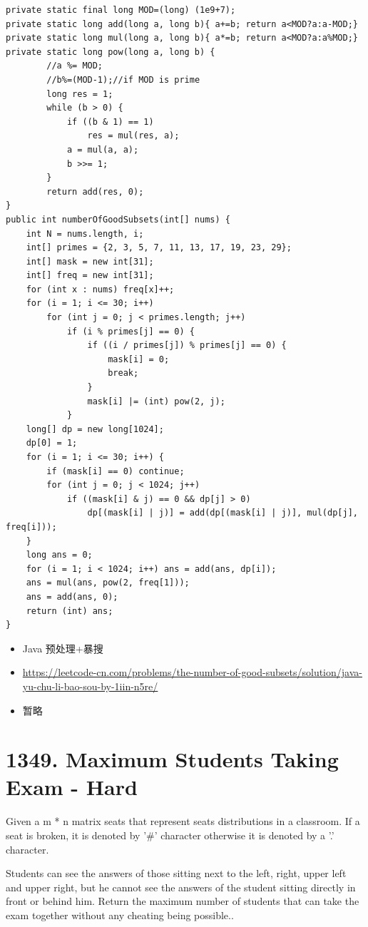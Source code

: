 \documentclass[9pt, b5paaper]{book}
\begin{document}
\begin{verbatim}
private static final long MOD=(long) (1e9+7);
private static long add(long a, long b){ a+=b; return a<MOD?a:a-MOD;}
private static long mul(long a, long b){ a*=b; return a<MOD?a:a%MOD;}
private static long pow(long a, long b) {
        //a %= MOD;
        //b%=(MOD-1);//if MOD is prime
        long res = 1;
        while (b > 0) {
            if ((b & 1) == 1)
                res = mul(res, a);
            a = mul(a, a);
            b >>= 1;
        }
        return add(res, 0);
}
public int numberOfGoodSubsets(int[] nums) {
    int N = nums.length, i;
    int[] primes = {2, 3, 5, 7, 11, 13, 17, 19, 23, 29};
    int[] mask = new int[31];
    int[] freq = new int[31];
    for (int x : nums) freq[x]++;
    for (i = 1; i <= 30; i++) 
        for (int j = 0; j < primes.length; j++) 
            if (i % primes[j] == 0) {
                if ((i / primes[j]) % primes[j] == 0) {
                    mask[i] = 0;
                    break;
                }
                mask[i] |= (int) pow(2, j);
            }
    long[] dp = new long[1024];
    dp[0] = 1;
    for (i = 1; i <= 30; i++) {
        if (mask[i] == 0) continue;
        for (int j = 0; j < 1024; j++) 
            if ((mask[i] & j) == 0 && dp[j] > 0)
                dp[(mask[i] | j)] = add(dp[(mask[i] | j)], mul(dp[j], freq[i]));
    }
    long ans = 0;
    for (i = 1; i < 1024; i++) ans = add(ans, dp[i]);
    ans = mul(ans, pow(2, freq[1]));
    ans = add(ans, 0);
    return (int) ans;
}
\end{verbatim}
\begin{itemize}
\item Java 预处理+暴搜
\item \url{https://leetcode-cn.com/problems/the-number-of-good-subsets/solution/java-yu-chu-li-bao-sou-by-1iin-n5re/}
\item 暂略
\end{itemize}

\section{1349. Maximum Students Taking Exam - Hard}
\label{sec-11-12}
Given a m * n matrix seats  that represent seats distributions in a classroom. If a seat is broken, it is denoted by '\#' character otherwise it is denoted by a '.' character.

Students can see the answers of those sitting next to the left, right, upper left and upper right, but he cannot see the answers of the student sitting directly in front or behind him. Return the maximum number of students that can take the exam together without any cheating being possible..
\end{document}
